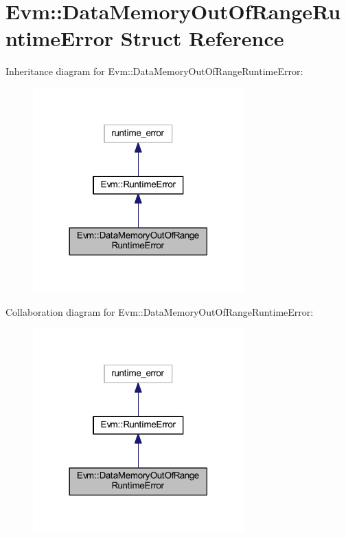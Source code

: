 \hypertarget{struct_evm_1_1_data_memory_out_of_range_runtime_error}{}\section{Evm\+:\+:Data\+Memory\+Out\+Of\+Range\+Runtime\+Error Struct Reference}
\label{struct_evm_1_1_data_memory_out_of_range_runtime_error}


Inheritance diagram for Evm\+:\+:Data\+Memory\+Out\+Of\+Range\+Runtime\+Error\+:
\nopagebreak
\begin{figure}[H]
\begin{center}
\leavevmode
\includegraphics[width=230pt]{struct_evm_1_1_data_memory_out_of_range_runtime_error__inherit__graph}
\end{center}
\end{figure}


Collaboration diagram for Evm\+:\+:Data\+Memory\+Out\+Of\+Range\+Runtime\+Error\+:
\nopagebreak
\begin{figure}[H]
\begin{center}
\leavevmode
\includegraphics[width=230pt]{struct_evm_1_1_data_memory_out_of_range_runtime_error__coll__graph}
\end{center}
\end{figure}
